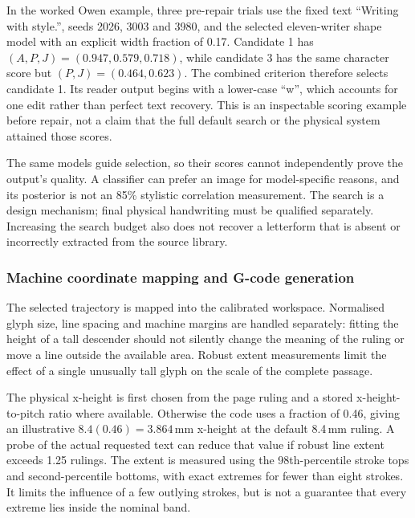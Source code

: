 In the worked Owen example, three pre-repair trials use the fixed text ``Writing with style.'', seeds 2026, 3003 and 3980, and the selected eleven-writer shape model with an explicit width fraction of 0.17. Candidate 1 has $(A,P,J)=(0.947,0.579,0.718)$, while candidate 3 has the same character score but $(P,J)=(0.464,0.623)$. The combined criterion therefore selects candidate 1. Its reader output begins with a lower-case ``w'', which accounts for one edit rather than perfect text recovery. This is an inspectable scoring example before repair, not a claim that the full default search or the physical system attained those scores.

The same models guide selection, so their scores cannot independently prove the output's quality. A classifier can prefer an image for model-specific reasons, and its posterior is not an 85\% stylistic correlation measurement. The search is a design mechanism; final physical handwriting must be qualified separately. Increasing the search budget also does not recover a letterform that is absent or incorrectly extracted from the source library.

\subsubsection{Machine coordinate mapping and G-code generation}
\label{sec:des-gcode}
The selected trajectory is mapped into the calibrated workspace. Normalised glyph size, line spacing and machine margins are handled separately: fitting the height of a tall descender should not silently change the meaning of the ruling or move a line outside the available area. Robust extent measurements limit the effect of a single unusually tall glyph on the scale of the complete passage.

The physical x-height is first chosen from the page ruling and a stored x-height-to-pitch ratio where available. Otherwise the code uses a fraction of 0.46, giving an illustrative $8.4(0.46)=3.864$\,mm x-height at the default 8.4\,mm ruling. A probe of the actual requested text can reduce that value if robust line extent exceeds 1.25 rulings. The extent is measured using the 98th-percentile stroke tops and second-percentile bottoms, with exact extremes for fewer than eight strokes. It limits the influence of a few outlying strokes, but is not a guarantee that every extreme lies inside the nominal band.

